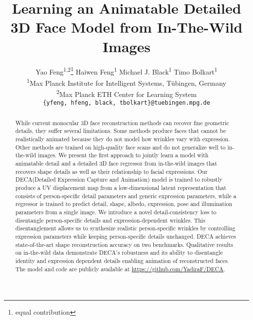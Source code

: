 \documentclass[final]{cvpr}
\newcommand{\modelname}{DECA\xspace}
\begin{document}
\title{Learning an Animatable Detailed 3D Face Model from In-The-Wild Images}

\author{Yao Feng\textsuperscript{1,2}\thanks{equal contribution}  \qquad Haiwen Feng\textsuperscript{1} \qquad Michael J. Black\textsuperscript{1} \qquad Timo Bolkart\textsuperscript{1}  \\
\textsuperscript{1}Max Planck Institute for Intelligent Systems, T{\"u}bingen, Germany \\
\textsuperscript{2}Max Planck ETH Center for Learning System \\
{\tt\small \{yfeng, hfeng, black, tbolkart\}@tuebingen.mpg.de}
}

\maketitle


\begin{abstract}
While current monocular 3D face reconstruction methods can recover fine geometric details, they suffer several limitations.
Some methods produce faces that cannot be realistically animated because they do not model how wrinkles vary with expression.
Other methods are trained on high-quality face scans and do not generalize well to in-the-wild images.
We present the first approach to jointly learn a model with animatable detail and a detailed 3D face regressor from in-the-wild images that recovers shape details as well as their relationship to facial expressions. 
Our \modelname (Detailed Expression Capture and Animation) model is trained to robustly produce a UV displacement map from a low-dimensional latent representation that consists of person-specific detail parameters and generic expression parameters, while a regressor is trained to predict detail, shape, albedo, expression, pose and illumination parameters from a single image. 
We introduce a novel detail-consistency loss to disentangle person-specific details and expression-dependent wrinkles.
This disentanglement allows us to synthesize realistic person-specific wrinkles by controlling expression parameters while keeping person-specific details unchanged. 
\modelname achieves state-of-the-art shape reconstruction accuracy on two benchmarks. 
Qualitative results on in-the-wild data demonstrate \modelname's robustness and its ability to disentangle identity and expression dependent details enabling animation of reconstructed faces.
The model and code are publicly available at \url{https://github.com/YadiraF/DECA}.
\end{abstract}
 
\end{document}
